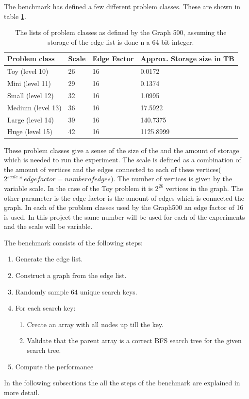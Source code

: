 The benchmark has defined a few different problem classes. These are shown in table \ref{tab:problem_scales}. 
\begin{table}[!h]
	\begin{center}
	\begin{tabular}{|l|l|l|l|}
		\hline
		Problem class     & Scale & Edge Factor & Approx. Storage size in TB \\ \hline
		Toy (level 10)    & 26    & 16          & 0.0172                     \\ \hline
		Mini (level 11)   & 29    & 16          & 0.1374                     \\ \hline
		Small (level 12)  & 32    & 16          & 1.0995                     \\ \hline
		Medium (level 13) & 36    & 16          & 17.5922                    \\ \hline
		Large (level 14)  & 39    & 16          & 140.7375                   \\ \hline
		Huge (level 15)   & 42    & 16          & 1125.8999                  \\ \hline
	\end{tabular}
	\caption{The lists of problem classes as defined by the Graph 500, assuming the storage of the edge list is done n a 64-bit integer.}
	\label{tab:problem_scales}
	\end{center}
\end{table}
These problem classes give a sense of the size of the  and the amount of storage which is needed to run the experiment. The scale is defined as a combination of the amount of vertices and the edges connected to each of these vertices($2^{scale} * edgefactor = number of edges$). The number of vertices is given by the variable scale. In the case of the Toy  problem it is $2^26$ vertices in the graph. The other parameter is the edge factor is the amount of edges which is connected the graph. In each of the problem classes used by the Graph500 an edge factor of 16 is used. In this project the same number will be used for each of the experiments and the scale will be variable.

The benchmark consists of the following steps:
\begin{enumerate}
	\item Generate the edge list.
	\item Construct a graph from the edge list.
	\item Randomly sample 64 unique search keys.
	\item For each search key:
	\begin{enumerate}
		\item Create an array with all nodes up till the key.
		\item Validate that the parent array is a correct BFS search tree for the given search tree.
	\end{enumerate}
	\item Compute the performance
\end{enumerate}
In the following subsections the all the steps of the benchmark are explained in more detail.

